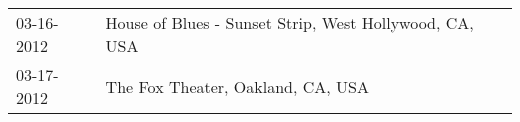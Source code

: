 \begin{supertabular}{ll}
 03-16-2012 &  House of Blues - Sunset Strip, West Hollywood, CA, USA \\
 03-17-2012 &                       The Fox Theater, Oakland, CA, USA \\
\end{supertabular}
